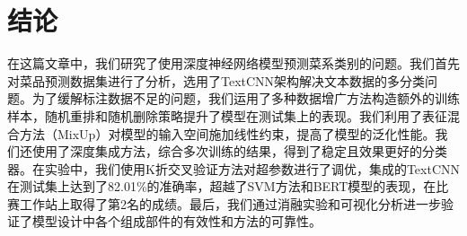 \section{结论}

在这篇文章中，我们研究了使用深度神经网络模型预测菜系类别的问题。我们首先对菜品预测数据集进行了分析，选用了TextCNN架构解决文本数据的多分类问题。为了缓解标注数据不足的问题，我们运用了多种数据增广方法构造额外的训练样本，随机重排和随机删除策略提升了模型在测试集上的表现。我们利用了表征混合方法（MixUp）对模型的输入空间施加线性约束，提高了模型的泛化性能。我们还使用了深度集成方法，综合多次训练的结果，得到了稳定且效果更好的分类器。在实验中，我们使用K折交叉验证方法对超参数进行了调优，集成的TextCNN在测试集上达到了82.01\%的准确率，超越了SVM方法和BERT模型的表现，在比赛工作站上取得了第2名的成绩。最后，我们通过消融实验和可视化分析进一步验证了模型设计中各个组成部件的有效性和方法的可靠性。
